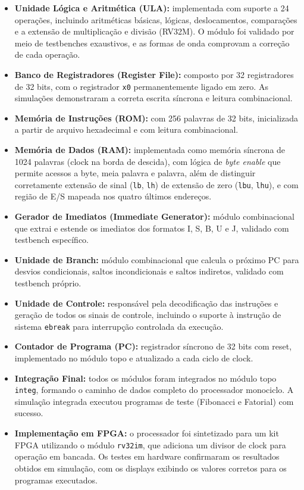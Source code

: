 \documentclass[
	12pt,				%
	oneside,
	a4paper,			%
	english,			%
	french,				%
	spanish,			%
	brazil,				%
	]{abntex2}
\begin{document}
\begin{itemize}
  \item \textbf{Unidade Lógica e Aritmética (ULA):} implementada com suporte a 24 operações, incluindo aritméticas básicas, lógicas, deslocamentos, comparações e a extensão de multiplicação e divisão (RV32M). O módulo foi validado por meio de testbenches exaustivos, e as formas de onda comprovam a correção de cada operação.
  \item \textbf{Banco de Registradores (Register File):} composto por 32 registradores de 32 bits, com o registrador \texttt{x0} permanentemente ligado em zero. As simulações demonstraram a correta escrita síncrona e leitura combinacional.
  \item \textbf{Memória de Instruções (ROM):} com 256 palavras de 32 bits, inicializada a partir de arquivo hexadecimal e com leitura combinacional.
  \item \textbf{Memória de Dados (RAM):} implementada como memória síncrona de 1024 palavras (clock na borda de descida), com lógica de \textit{byte enable} que permite acessos a byte, meia palavra e palavra, além de distinguir corretamente extensão de sinal (\texttt{lb}, \texttt{lh}) de extensão de zero (\texttt{lbu}, \texttt{lhu}), e com região de E/S mapeada nos quatro últimos endereços.
  \item \textbf{Gerador de Imediatos (Immediate Generator):} módulo combinacional que extrai e estende os imediatos dos formatos I, S, B, U e J, validado com testbench específico.
  \item \textbf{Unidade de Branch:} módulo combinacional que calcula o próximo PC para desvios condicionais, saltos incondicionais e saltos indiretos, validado com testbench próprio.
  \item \textbf{Unidade de Controle:} responsável pela decodificação das instruções e geração de todos os sinais de controle, incluindo o suporte à instrução de sistema \texttt{ebreak} para interrupção controlada da execução.
  \item \textbf{Contador de Programa (PC):} registrador síncrono de 32 bits com reset, implementado no módulo topo e atualizado a cada ciclo de clock.
  \item \textbf{Integração Final:} todos os módulos foram integrados no módulo topo \texttt{integ}, formando o caminho de dados completo do processador monociclo. A simulação integrada executou programas de teste (Fibonacci e Fatorial) com sucesso.
  \item \textbf{Implementação em FPGA:} o processador foi sintetizado para um kit FPGA utilizando o módulo \texttt{rv32im}, que adiciona um divisor de clock para operação em bancada. Os testes em hardware confirmaram os resultados obtidos em simulação, com os displays exibindo os valores corretos para os programas executados.
\end{itemize}
\end{document}
